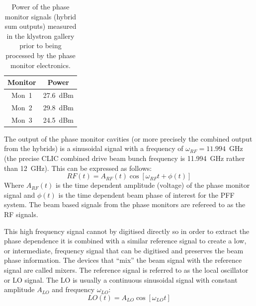 \begin{table}
  \begin{center}
    \begin{tabular}{|c c|}
	   \hline
       Monitor & Power \\ \hline
       Mon~1 & 27.6~dBm \\
       Mon~2 & 29.8~dBm \\
       Mon~3 & 24.5~dBm \\ \hline
    \end{tabular}
    \caption{Power of the phase monitor signals (hybrid sum outputs) measured in the klystron gallery prior to being processed by the phase monitor electronics.}
  	\label{t:monPowers}
  \end{center}
\end{table}






The output of the phase monitor cavities (or more precisely the combined output from the hybrids) is a sinusoidal signal with a frequency of \(\omega_{RF} = 11.994\)~GHz (the precise CLIC combined drive beam bunch frequency is 11.994~GHz rather than 12~GHz). This can be expressed as follows:
\begin{equation}
RF(t) = A_{RF}(t)\cos[\omega_{RF} t + \phi(t)]
\end{equation}
Where \(A_{RF}(t)\) is the time dependent amplitude (voltage) of the phase monitor signal and \(\phi(t)\) is the time dependent beam phase of interest for the PFF system. The beam based signals from the phase monitors are refereed to as the RF signals.

This high frequency signal cannot by digitised directly so in order to extract the phase dependence it is combined with a similar reference signal to create a low, or intermediate, frequency signal that can be digitised and preserves the beam phase information. The devices that ``mix'' the beam signal with the reference signal are called mixers. The reference signal is referred to as the local oscillator or LO signal. The LO is usually a continuous sinusoidal signal with constant amplitude \(A_{LO}\) and frequency \(\omega_{LO}\):
\begin{equation}
LO(t) = A_{LO}\cos[\omega_{LO} t]
\end{equation}

